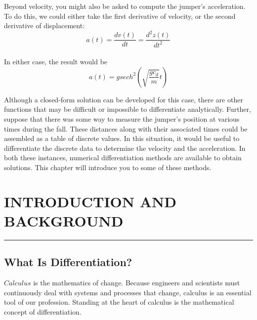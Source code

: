 \documentclass[../main.tex]{subfiles}
\begin{document}
Beyond velocity, you might also be asked to compute the jumper's acceleration. To
do this, we could either take the first derivative of velocity, or the second derivative of
displacement:
\begin{equation}
	\tag{21.4}
	a(t) = \dfrac{dv(t)}{dt} = \dfrac{d^{2}z(t)}{dt^{2}}
\end{equation}\\
In either case, the result would be
\begin{equation}
	\tag{21.5}
	a(t) = g sech^{2} \left( \sqrt{\dfrac{gc_{d}}{m}}t \right)
\end{equation}

Although a closed-form solution can be developed for this case, there are other functions that may be difficult or impossible to differentiate analytically. Further, suppose that
there was some way to measure the jumper's position at various times during the fall.
These distances along with their associated times could be assembled as a table of discrete
values. In this situation, it would be useful to differentiate the discrete data to determine the
velocity and the acceleration. In both these instances, numerical differentiation methods
are available to obtain solutions. This chapter will introduce you to some of these methods.

\vspace{0,6in}
\section{INTRODUCTION AND BACKGROUND}
\vspace{0,1in}
\hrule
\vspace{0,1in}
\subsection{What Is Differentiation?}
$Calculus$ is the mathematics of change. Because engineers and scientists must continuously
deal with systems and processes that change, calculus is an essential tool of our profession.
Standing at the heart of calculus is the mathematical concept of differentiation.
\end{document}
